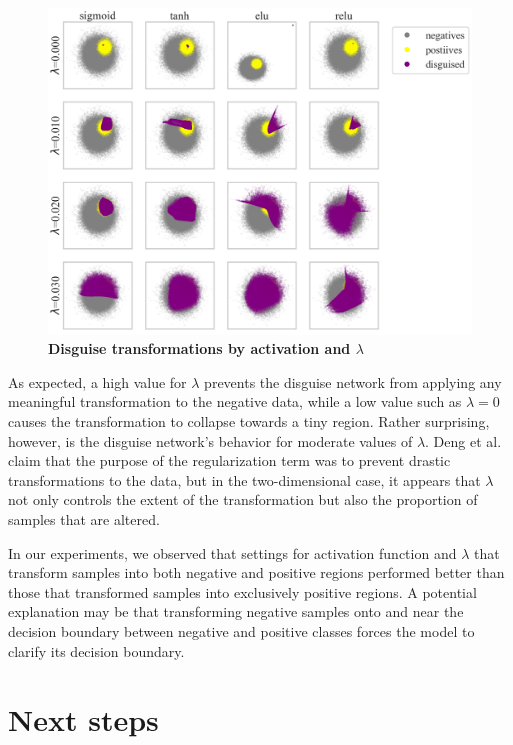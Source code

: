 \documentclass{proc}
\begin{document}
\begin{figure}[h!]
	\begin{center}
		\includegraphics*[scale=0.55]{../figures/disguise-plots.png}
		\caption{\textbf{Disguise transformations by activation and $\lambda$}}
		\label{fig:disguise-plots}
	\end{center}
\end{figure}

As expected, a high value for $\lambda$ prevents the disguise network from applying any meaningful transformation to the negative data, while a low value such as $\lambda = 0$ causes the transformation to collapse towards a tiny region. Rather surprising, however, is the disguise network's behavior for moderate values of $\lambda$. Deng et al. claim that the purpose of the regularization term was to prevent drastic transformations to the data, but in the two-dimensional case, it appears that $\lambda$ not only controls the extent of the transformation but also the proportion of samples that are altered.

In our experiments, we observed that settings for activation function and $\lambda$ that transform samples into both negative and positive regions performed better than those that transformed samples into exclusively positive regions. A potential explanation may be that transforming negative samples onto and near the decision boundary between negative and positive classes forces the model to clarify its decision boundary.

\section{Next steps}
\end{document}
